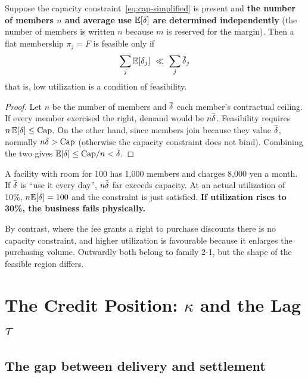 \begin{proposition}
\label{prop:capacity}
Suppose the capacity constraint~\eqref{eq:cap-simplified} is present and
\textbf{the number of members $n$ and average use $\mathbb{E}[\delta]$ are determined independently}
(the number of members is written $n$ because $m$ is reserved for the margin).
Then a flat membership $\pi_j=F$ is feasible only if
\begin{equation}
\sum_{j}\E[\delta_j] \ \ll\ \sum_{j}\dbar_j
\end{equation}
that is, low utilization is a condition of feasibility.
\end{proposition}

\begin{proof}
Let $n$ be the number of members and $\dbar$ each member's contractual ceiling. If every
member exercised the right, demand would be $n\dbar$. Feasibility requires
$n\,\mathbb{E}[\delta] \leq \mathrm{Cap}$. On the other hand, since members join because they value
$\dbar$, normally $n\dbar > \mathrm{Cap}$ (otherwise the capacity constraint does not bind).
Combining the two gives $\E[\delta] \leq \mathrm{Cap}/n < \dbar$.
\end{proof}

\begin{example}
A facility with room for 100 has 1{,}000 members and charges 8{,}000 yen a month.
If $\dbar$ is ``use it every day'', $n\dbar$ far exceeds capacity. At an actual utilization
of 10\%, $n\mathbb{E}[\delta]=100$ and the constraint is just satisfied.
\textbf{If utilization rises to 30\%, the business fails physically.}

By contrast, where the fee grants a right to purchase discounts there is no capacity
constraint, and higher utilization is favourable because it enlarges the purchasing volume.
Outwardly both belong to family 2-1, but the shape of the feasible region differs.
\end{example}

\chapter{The Credit Position: \texorpdfstring{$\kappa$}{kappa} and the Lag \texorpdfstring{$\tau$}{tau}}
\label{sec:kappa}

\section{The gap between delivery and settlement}

